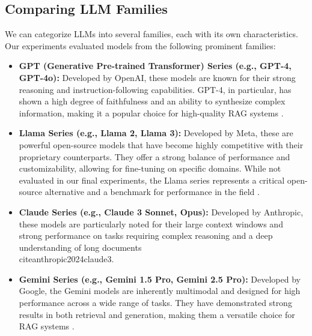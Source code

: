 \subsection{Comparing LLM Families}
We can categorize LLMs into several families, each with its own characteristics. Our experiments evaluated models from the following prominent families:
\begin{itemize}
    \item \textbf{GPT (Generative Pre-trained Transformer) Series (e.g., GPT-4, GPT-4o):} Developed by OpenAI, these models are known for their strong reasoning and instruction-following capabilities. GPT-4, in particular, has shown a high degree of faithfulness and an ability to synthesize complex information, making it a popular choice for high-quality RAG systems \autocite{openai2024gpt4technicalreport}.
    \item \textbf{Llama Series (e.g., Llama 2, Llama 3):} Developed by Meta, these are powerful open-source models that have become highly competitive with their proprietary counterparts. They offer a strong balance of performance and customizability, allowing for fine-tuning on specific domains. While not evaluated in our final experiments, the Llama series represents a critical open-source alternative and a benchmark for performance in the field \autocite{touvron2023llama}.
    \item \textbf{Claude Series (e.g., Claude 3 Sonnet, Opus):} Developed by Anthropic, these models are particularly noted for their large context windows and strong performance on tasks requiring complex reasoning and a deep understanding of long documents \\cite{anthropic2024claude3}.
    \item \textbf{Gemini Series (e.g., Gemini 1.5 Pro, Gemini 2.5 Pro):} Developed by Google, the Gemini models are inherently multimodal and designed for high performance across a wide range of tasks. They have demonstrated strong results in both retrieval and generation, making them a versatile choice for RAG systems \autocite{gemini2023}.
\end{itemize}

